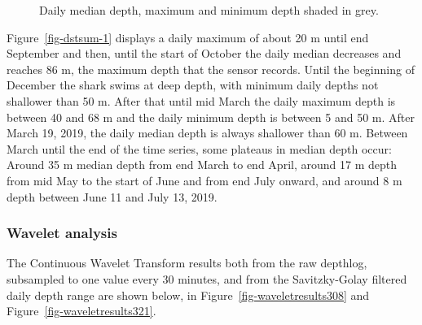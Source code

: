 \documentclass[
  authoryear,
  review,
  3p]{elsarticle}
\begin{document}
\begin{figure}

\begin{minipage}[t]{\linewidth}

{\centering 


}

\end{minipage}%
\newline
\begin{minipage}[t]{\linewidth}

{\centering 


}

\end{minipage}%

\caption{\label{fig-dstsum}Daily median depth, maximum and minimum depth
shaded in grey.}

\end{figure}

Figure~\ref{fig-dstsum-1} displays a daily maximum of about 20 m until
end September and then, until the start of October the daily median
decreases and reaches 86 m, the maximum depth that the sensor records.
Until the beginning of December the shark swims at deep depth, with
minimum daily depths not shallower than 50 m. After that until mid March
the daily maximum depth is between 40 and 68 m and the daily minimum
depth is between 5 and 50 m. After March 19, 2019, the daily median
depth is always shallower than 60 m. Between March until the end of the
time series, some plateaus in median depth occur: Around 35 m median
depth from end March to end April, around 17 m depth from mid May to the
start of June and from end July onward, and around 8 m depth between
June 11 and July 13, 2019.

\hypertarget{wavelet-analysis}{%
\subsubsection{Wavelet analysis}\label{wavelet-analysis}}

The Continuous Wavelet Transform results both from the raw depthlog,
subsampled to one value every 30 minutes, and from the Savitzky-Golay
filtered daily depth range are shown below, in
Figure~\ref{fig-waveletresults308} and
Figure~\ref{fig-waveletresults321}.
\end{document}

